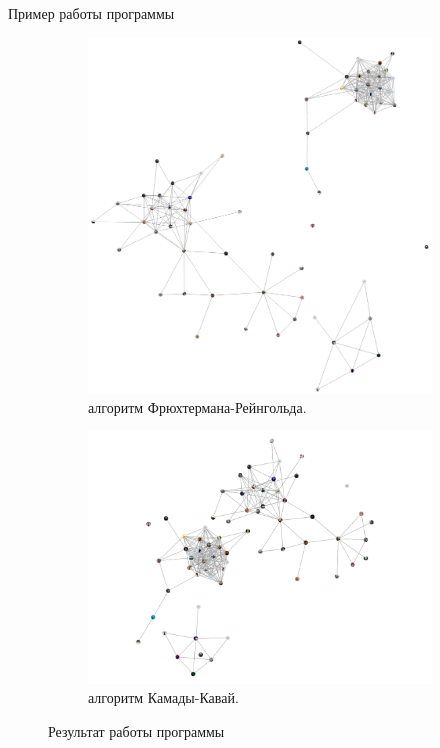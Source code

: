 \documentclass{beamer}
\begin{document}
\begin{frame}{Пример работы программы}

	\begin{figure}[H]
		\centering
		\begin{subfigure}[b]{0.48\textwidth}
			\centering
			\includegraphics[width=\linewidth]{./imgs/fr.png}
			\caption*{алгоритм Фрюхтермана-Рейнгольда.}
		\end{subfigure}
		\begin{subfigure}[b]{0.50\textwidth}
			\centering
			\includegraphics[width=\linewidth]{./imgs/kk.png}
			\captionsetup{font=small}
			\caption*{алгоритм Камады-Кавай.}
		\end{subfigure}
		\caption{Результат работы программы}
	\end{figure}


\end{frame}
\end{document}
